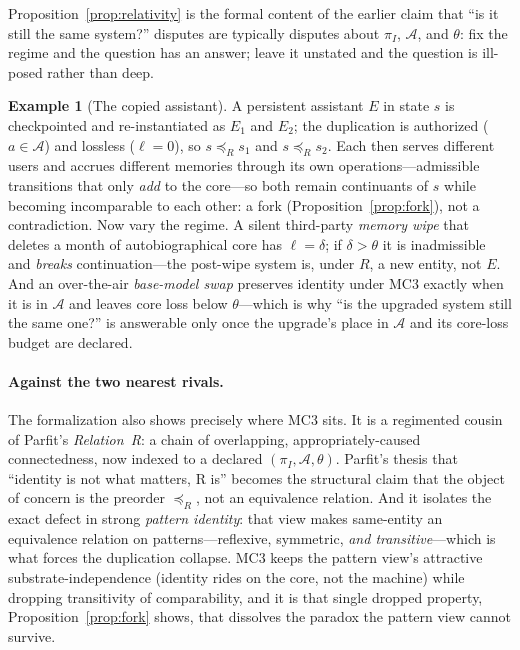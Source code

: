 \documentclass[11pt,a4paper]{article}
\theoremstyle{definition}
\newtheorem{example}{Example}
\begin{document}
Proposition~\ref{prop:relativity} is the formal content of the earlier claim that ``is it still the same system?'' disputes are typically disputes about $\pi_I$, $\mathcal{A}$, and $\theta$: fix the regime and the question has an answer; leave it unstated and the question is ill-posed rather than deep.

\begin{example}[The copied assistant]
A persistent assistant $E$ in state $s$ is checkpointed and re-instantiated as $E_1$ and $E_2$; the duplication is authorized ($a\in\mathcal{A}$) and lossless ($\ell=0$), so $s\preceq_R s_1$ and $s\preceq_R s_2$. Each then serves different users and accrues different memories through its own operations---admissible transitions that only \emph{add} to the core---so both remain continuants of $s$ while becoming incomparable to each other: a fork (Proposition~\ref{prop:fork}), not a contradiction. Now vary the regime. A silent third-party \emph{memory wipe} that deletes a month of autobiographical core has $\ell=\delta$; if $\delta>\theta$ it is inadmissible and \emph{breaks} continuation---the post-wipe system is, under $R$, a new entity, not $E$. And an over-the-air \emph{base-model swap} preserves identity under MC3 exactly when it is in $\mathcal{A}$ and leaves core loss below $\theta$---which is why ``is the upgraded system still the same one?'' is answerable only once the upgrade's place in $\mathcal{A}$ and its core-loss budget are declared.
\end{example}

\paragraph{Against the two nearest rivals.} The formalization also shows precisely where MC3 sits. It is a regimented cousin of Parfit's \emph{Relation~R}: a chain of overlapping, appropriately-caused connectedness, now indexed to a declared $(\pi_I,\mathcal{A},\theta)$. Parfit's thesis that ``identity is not what matters, R is'' becomes the structural claim that the object of concern is the preorder $\preceq_R$, not an equivalence relation. And it isolates the exact defect in strong \emph{pattern identity}: that view makes same-entity an equivalence relation on patterns---reflexive, symmetric, \emph{and transitive}---which is what forces the duplication collapse. MC3 keeps the pattern view's attractive substrate-independence (identity rides on the core, not the machine) while dropping transitivity of comparability, and it is that single dropped property, Proposition~\ref{prop:fork} shows, that dissolves the paradox the pattern view cannot survive.
\end{document}
